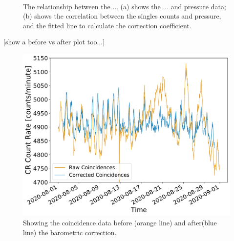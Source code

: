 \begin{figure}[ht!]
	\centering
	 \\
	
	\caption{The relationship between the ... (a) shows the ... and pressure data; (b) shows the correlation between the singles counts and pressure, and the fitted line to calculate the correction coefficient.}
	\label{fig:14008_CR_V_P_corr}
\end{figure}


[show a before vs after plot too...]


\begin{figure}[ht!]
	\centering
	\includegraphics[width=0.75\columnwidth]{raw_vs_corrected_coincidences.pdf}
	\caption{Showing the coincidence data before (orange line) and after(blue line) the barometric correction.}
	\label{fig:HS_14008_corrected_coincidences}
\end{figure}



